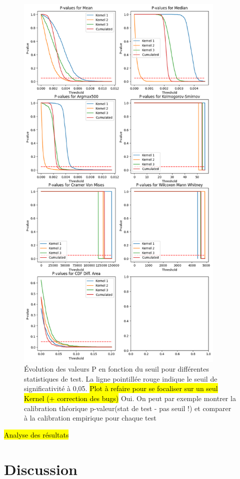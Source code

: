 \documentclass{article}
\newcommand{\dm}[1]{{\color{mulberry} #1}}
\begin{document}
\begin{figure}[H]
\centering
\includegraphics[width=10cm]{img/p-values.png}
\caption{Évolution des valeurs P en fonction du seuil pour différentes statistiques de test. La ligne pointillée rouge indique le seuil de significativité à 0,05. \hl{Plot à refaire pour se focaliser sur un seul Kernel (+ correction des bugs)} \dm{Oui. On peut par exemple montrer la calibration théorique p-valeur(stat de test - pas seuil !) et comparer à la calibration empirique pour chaque test }}


\label{fig:pvalues}
\end{figure}

\hl{Analyse des résultats}


\section{Discussion}
\end{document}
